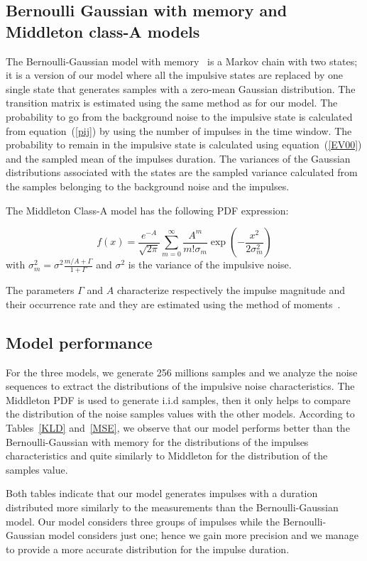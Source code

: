 \documentclass[journal]{IEEEtran}
\begin{document}
\subsection{Bernoulli Gaussian with memory and Middleton class-A models}
The Bernoulli-Gaussian model with memory~\cite{PLC} is a Markov chain with two states; it is a version of our model where all the impulsive states are replaced by one single state that generates samples with a zero-mean Gaussian distribution. The transition matrix is estimated using the same method as for our model. The probability to go from the background noise to the impulsive state is calculated from equation~(\ref{pij}) by using the number of impulses in the time window. The probability to remain in the impulsive state is calculated using equation~(\ref{EV00}) and the sampled mean of the impulses duration. The variances of the Gaussian distributions associated with the states are the sampled variance calculated from the samples belonging to the background noise and the impulses.\

The Middleton Class-A model has the following PDF expression:\

\begin{equation}\label{Mid_pdf}
        f(x)=\frac{e^{-A}}{\sqrt{2\pi}}\sum\limits^{\infty}_{m=0}\frac{A^m}{m!\sigma_m}\exp(-\frac{x^2}{2\sigma^2_m})
\end{equation}
with $\sigma_m^2=\sigma^2 \frac{m/A+\Gamma}{1+\Gamma}$ and $\sigma^2$ is the variance of the impulsive noise.\

The parameters $\Gamma$ and $A$ characterize respectively the impulse magnitude and their occurrence rate and they are estimated using the method of moments~\cite{midd3}.
\subsection{Model performance}
For the three models, we generate 256 millions samples and we analyze the noise sequences to extract the distributions of the impulsive noise characteristics. The Middleton PDF is used to generate i.i.d samples, then it only helps to compare the distribution of the noise samples values with the other models. According to Tables~\ref{KLD} and~\ref{MSE}, we observe that our model performs better than the Bernoulli-Gaussian with memory for the distributions of the impulses characteristics and quite similarly to Middleton for the distribution of the samples value.\

Both tables indicate that our model generates impulses with a duration distributed more similarly to the measurements than the Bernoulli-Gaussian model. Our model considers three groups of impulses while the Bernoulli-Gaussian model considers just one; hence we gain more precision and we manage to provide a more accurate distribution for the impulse duration.\
\end{document}
